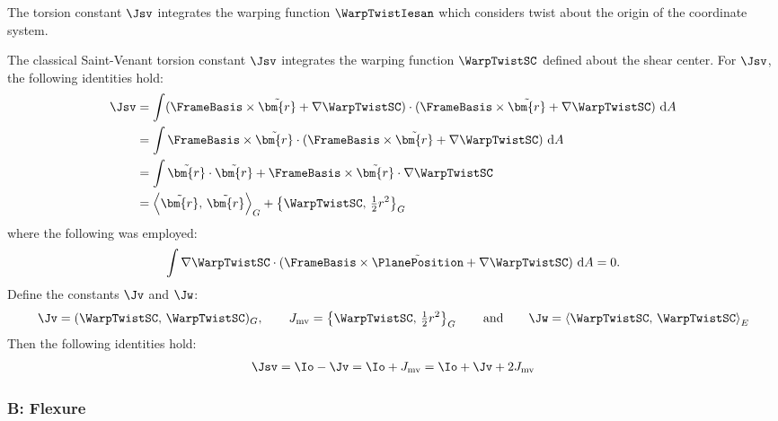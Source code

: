 \begin{remark}\label{rem:torsion-constant}
The torsion constant \(\Jsv\) integrates the warping function \(\WarpTwistIesan\) which considers twist about the origin of the coordinate system.

The classical Saint-Venant torsion constant \(\Jsv\) integrates the warping function \(\WarpTwistSC\) defined about the shear center. 
For \(\Jsv\), the following identities hold:
\begin{equation*}
    \begin{aligned}
        \Jsv &= \int (\FrameBasis\times\tilde{\bm{r}} + \nabla \WarpTwistSC) \cdot (\FrameBasis\times\tilde{\bm{r}} + \nabla \WarpTwistSC) \mathrm{~d}A \\
        &= \int \FrameBasis\times\tilde{\bm{r}} \cdot (\FrameBasis\times\tilde{\bm{r}} + \nabla \WarpTwistSC) \mathrm{~d}A \\
        &= \int \tilde{\bm{r}}\cdot\tilde{\bm{r}} + \FrameBasis\times\tilde{\bm{r}} \cdot \nabla \WarpTwistSC \\
        &= \left<\tilde{\bm{r}},\, \tilde{\bm{r}}\right>_G + \left\{\WarpTwistSC,\, \tfrac12 r^2\right\}_G
    \end{aligned}
\end{equation*}
where the following was employed:
\[
\int \nabla \WarpTwistSC \cdot (\FrameBasis\times \tilde{\PlanePosition} + \nabla\WarpTwistSC)\mathrm{~d}A = 0.
\]
Define the constants \(\Jv\) and \(\Jw\):
\begin{equation*}
    \Jv = ( \WarpTwistSC,\,\WarpTwistSC)_G,
    \qquad
    J_{\rm{mv}} = \left\{\WarpTwistSC,\,\tfrac12 r^2\right\}_G
    \qquad\text{and}\qquad 
    \Jw = \left<\WarpTwistSC,\,\WarpTwistSC\right>_E
\end{equation*}
Then the following identities hold:
\begin{equation*}
\begin{aligned}
    \Jsv  = \Io - \Jv %
         = \Io + J_{\rm{mv}} %
         = \Io + \Jv + 2 J_{\rm{mv}}
\end{aligned}
\end{equation*}
\end{remark}



\subsubsection{B: Flexure}

